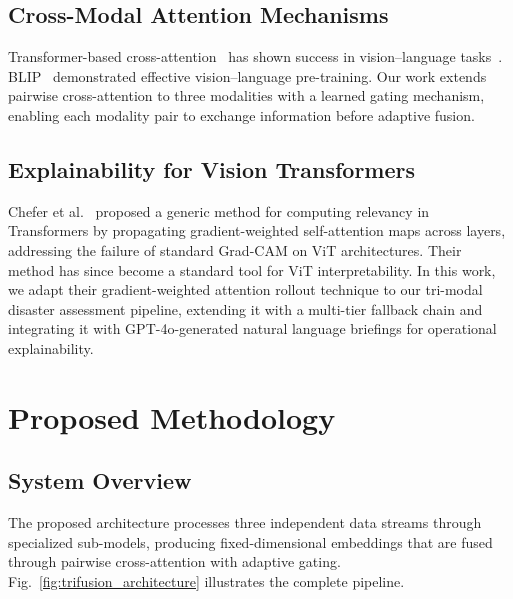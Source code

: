 \documentclass[journal]{IEEEtran}
\begin{document}
\subsection{Cross-Modal Attention Mechanisms}

Transformer-based cross-attention~\cite{vaswani2017attention} has shown success in vision--language tasks~\cite{lu2019vilbert,tan2019lxmert}. BLIP~\cite{li2022blip} demonstrated effective vision--language pre-training. Our work extends pairwise cross-attention to three modalities with a learned gating mechanism, enabling each modality pair to exchange information before adaptive fusion.

\subsection{Explainability for Vision Transformers}

Chefer et al.~\cite{chefer2021transformer} proposed a generic method for computing relevancy in Transformers by propagating gradient-weighted self-attention maps across layers, addressing the failure of standard Grad-CAM on ViT architectures. Their method has since become a standard tool for ViT interpretability. In this work, we adapt their gradient-weighted attention rollout technique to our tri-modal disaster assessment pipeline, extending it with a multi-tier fallback chain and integrating it with GPT-4o-generated natural language briefings for operational explainability.

\section{Proposed Methodology}

\subsection{System Overview}

The proposed architecture processes three independent data streams through specialized sub-models, producing fixed-dimensional embeddings that are fused through pairwise cross-attention with adaptive gating. Fig.~\ref{fig:trifusion_architecture} illustrates the complete pipeline.
\end{document}
